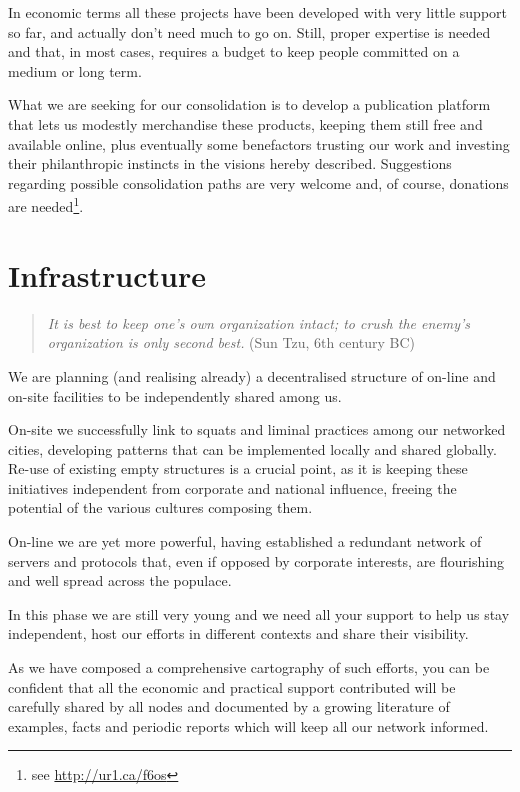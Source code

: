In economic terms all these projects have been developed with very little
support so far, and actually don't need much to go on. Still, proper expertise
is needed and that, in most cases, requires a budget to keep people committed on
a medium or long term.

What we are seeking for our consolidation is to develop a publication platform
that lets us modestly merchandise these products, keeping them still free and
available online, plus eventually some benefactors trusting our work and
investing their philanthropic instincts in the visions hereby described.
Suggestions regarding possible consolidation paths are very welcome and, of
course, donations are needed\footnote{see \url{http://ur1.ca/f6os}}.


\section{Infrastructure}
\label{s:weaver_birds:infrastructure}

\begin{quote}
\textit{It is best to keep one's own organization intact; to crush the enemy's
organization is only second best.} (Sun Tzu, 6th century BC)
\end{quote}

We are planning (and realising already) a decentralised structure of on-line and
on-site facilities to be independently shared among us.

On-site we successfully link to squats and liminal practices among our networked
cities, developing patterns that can be implemented locally and shared globally.
Re-use of existing empty structures is a crucial point, as it is keeping these
initiatives independent from corporate and national inf\hbox{}luence, freeing
the potential of the various cultures composing them.

On-line we are yet more powerful, having established a redundant network of
servers and protocols that, even if opposed by corporate interests, are
f\hbox{}lourishing and well spread across the populace.

In this phase we are still very young and we need all your support to help us
stay independent, host our ef\hbox{}forts in dif\hbox{}ferent contexts and share
their visibility.

As we have composed a comprehensive cartography of such ef\hbox{}forts, you can
be conf\hbox{}ident that all the economic and practical support contributed will
be carefully shared by all nodes and documented by a growing literature of
examples, facts and periodic reports which will keep all our network informed.\\

